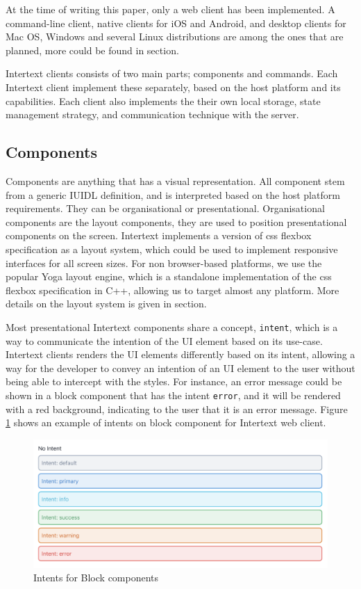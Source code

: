 At the time of writing this paper, only a web client has been implemented. A command-line client, native clients for iOS and Android, and desktop clients for Mac OS, Windows and several Linux distributions are among the ones that are planned, more could be found in  section.

Intertext clients consists of two main parts; components and commands. Each Intertext client implement these separately, based on the host platform and its capabilities. Each client also implements the  their own local storage, state management strategy, and communication technique with the server.

\subsection{Components}

Components are anything that has a visual representation. All component stem from a generic IUIDL definition, and is interpreted based on the host platform requirements. They can be organisational or presentational. Organisational components are the layout components, they are used to position presentational components on the screen. Intertext implements a version of css flexbox specification as a layout system, which could be used to implement responsive interfaces for all screen sizes. For non browser-based platforms, we use the popular Yoga layout engine, which is a standalone implementation of the css flexbox specification in C++, allowing us to target almost any platform. More details on the layout system is given in  section.

Most presentational Intertext components share a concept, \texttt{intent}, which is a way to communicate the intention of the UI element based on its use-case. Intertext clients renders the UI elements differently based on its intent, allowing a way for the developer to convey an intention of an UI element to the user without being able to intercept with the styles. For instance, an error message could be shown in a block component that has the intent \texttt{error}, and it will be rendered with a red background, indicating to the user that it is an error message. Figure \ref{fig:intents} shows an example of intents on block component for Intertext web client.

\begin{figure}
  \centering
  \includegraphics[width=13cm]{thesis/paper/images/intents.png}
  \caption{Intents for Block components}%
  \label{fig:intents}%
\end{figure}


